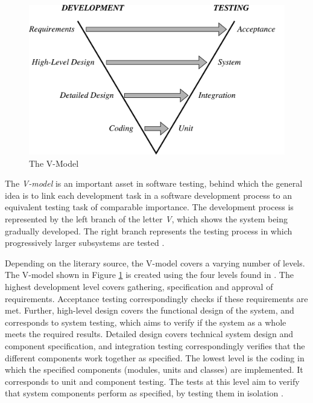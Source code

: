 \begin{figure}[h]
    \centering
    \includegraphics[width=\textwidth]{figures/new/v_model.pdf}
    \caption{The V-Model}
    \label{fig.v-model}
\end{figure}


\noindent The \emph{V-model} is an important asset in software testing, behind which the general idea is to link each development task in a software development process to an equivalent testing task of comparable importance. The development process is represented by the left branch of the letter \emph{V}, which shows the system being gradually developed. The right branch represents the testing process in which progressively larger subsystems are tested \cite{SoftwareTestingFoundations}.

Depending on the literary source, the V-model covers a varying number of levels. The V-model shown in Figure \ref{fig.v-model} is created using the four levels found in \cite{systematicSoftwareTesting}. The highest development level covers gathering, specification and approval of requirements. Acceptance testing correspondingly checks if these requirements are met. Further, high-level design covers the functional design of the system, and corresponds to system testing, which aims to verify if the system as a whole meets the required results. Detailed design covers technical system design and component specification, and integration testing correspondingly verifies that the different components work together as specified. The lowest level is the coding in which the specified components (modules, units and classes) are implemented. It corresponds to unit and component testing. The tests at this level aim to verify that system components perform as specified, by testing them in isolation  \cite{SoftwareTestingFoundations}.

